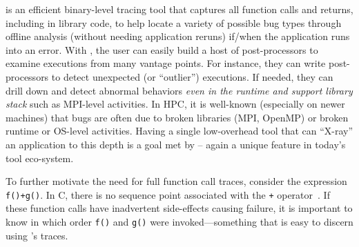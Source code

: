 \parlot is an efficient binary-level tracing tool that captures all function calls and returns, including in library code, 
to help locate a variety of possible bug types through 
offline analysis (without needing application reruns) 
if/when the application runs into an error. 
%
With \parlot, the user can easily build a host of post-processors to examine
executions from many vantage points.
%
For instance, they can write post-processors
to detect unexpected (or ``outlier'') executions.
%
If needed, they can 
drill down and detect abnormal behaviors {\em even in the runtime and
support library stack} such as MPI-level activities.
%
In HPC, it is well-known (especially on newer machines) that bugs are often due to
broken libraries (MPI, OpenMP) or broken runtime or OS-level activities.
%
Having a single low-overhead tool that can ``X-ray'' an application to this depth is a goal met by \parlot -- again a unique feature in today's tool eco-system.

To further motivate the need for full function call
traces, consider the expression {\tt f()+g()}.
%
In C, there is no sequence point associated with the {\tt +}
operator~\cite{sequence-points-in-C}.
%
If these function calls have inadvertent side-effects causing 
failure, it is important to know in which order {\tt f()}
and {\tt g()} were invoked---something that is easy to discern using
\parlot 's traces.


